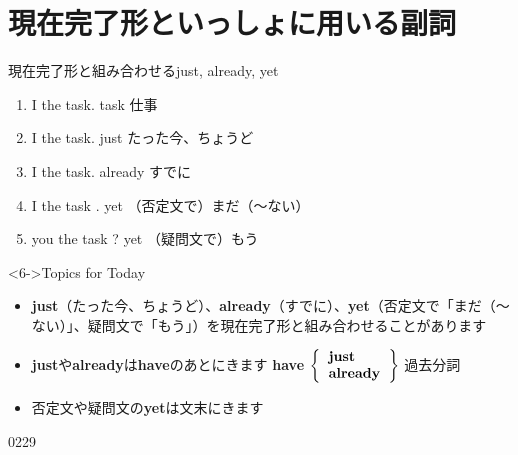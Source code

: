 \documentclass[aspectratio=169,xcolor={dvipsnames,table}]{beamer}
\newcommand{\myaudio}[1]{\href{#1}{\faVolumeUp}}
\begin{document}
\section{現在完了形といっしょに用いる副詞}
\begin{frame}[plain,t]{現在完了形と組み合わせるjust, already, yet}
\begin{enumerate}
 \item<1-> I  the task.%
\hfill{}{\scriptsize task  仕事}
 \item<2-> I    the task.%
\hfill{}{\scriptsize just  たった今、ちょうど}
 \item<3-> I    the task.%
\hfill{}{\scriptsize already  すでに}
 \item<4-> I    the task .%
\hfill{}{\scriptsize yet  （否定文で）まだ（～ない）}
 \item<5->  you  the task ?%
\hfill{}{\scriptsize yet  （疑問文で）もう}
\end{enumerate}

\bigskip

 \begin{block}<6->{Topics for Today}
\small
\begin{itemize}[square]\small
 \item \textbf{just}（たった今、ちょうど）、\textbf{already}（すでに）、\textbf{yet}（否定文で「まだ（～ない）」、疑問文で「もう」）を現在完了形と組み合わせることがあります
 \item \textbf{just}や\textbf{already}は\textbf{have}のあとにきます%
\hspace{70pt}\textbf{have} $\left\{
       \begin{tabular}{l}
	\textbf{just}\\
	\textbf{already}
       \end{tabular}
\right\}$ 過去分詞
 \item 否定文や疑問文の\textbf{yet}は文末にきます
\end{itemize}
      \end{block}

\vspace{-10pt}

\hfill{\scriptsize 0229}\,{\scriptsize \myaudio{./audio/014_have_pp_kekka_05b.mp3}}

\end{frame}
\end{document}
